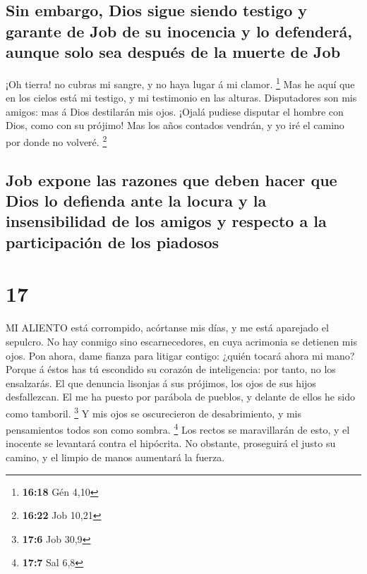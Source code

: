 \hypertarget{sin-embargo-dios-sigue-siendo-testigo-y-garante-de-job-de-su-inocencia-y-lo-defenderuxe1-aunque-solo-sea-despuuxe9s-de-la-muerte-de-job}{%
\subsection{Sin embargo, Dios sigue siendo testigo y garante de Job de
su inocencia y lo defenderá, aunque solo sea después de la muerte de
Job}\label{sin-embargo-dios-sigue-siendo-testigo-y-garante-de-job-de-su-inocencia-y-lo-defenderuxe1-aunque-solo-sea-despuuxe9s-de-la-muerte-de-job}}

 ¡Oh tierra! no cubras mi sangre, y no haya lugar á mi
clamor. \footnote{\textbf{16:18} Gén 4,10}  Mas he aquí que
en los cielos está mi testigo, y mi testimonio en las alturas.
 Disputadores son mis amigos: mas á Dios destilarán mis
ojos.  ¡Ojalá pudiese disputar el hombre con Dios, como con
su prójimo!  Mas los años contados vendrán, y yo iré el
camino por donde no volveré. \footnote{\textbf{16:22} Job 10,21}

\hypertarget{job-expone-las-razones-que-deben-hacer-que-dios-lo-defienda-ante-la-locura-y-la-insensibilidad-de-los-amigos-y-respecto-a-la-participaciuxf3n-de-los-piadosos}{%
\subsection{Job expone las razones que deben hacer que Dios lo defienda
ante la locura y la insensibilidad de los amigos y respecto a la
participación de los
piadosos}\label{job-expone-las-razones-que-deben-hacer-que-dios-lo-defienda-ante-la-locura-y-la-insensibilidad-de-los-amigos-y-respecto-a-la-participaciuxf3n-de-los-piadosos}}

\hypertarget{section-16}{%
\section{17}\label{section-16}}

 MI ALIENTO está corrompido, acórtanse mis días, y me está
aparejado el sepulcro.  No hay conmigo sino escarnecedores,
en cuya acrimonia se detienen mis ojos.  Pon ahora, dame
fianza para litigar contigo: ¿quién tocará ahora mi mano? 
Porque á éstos has tú escondido su corazón de inteligencia: por tanto,
no los ensalzarás.  El que denuncia lisonjas á sus prójimos,
los ojos de sus hijos desfallezcan.  El me ha puesto por
parábola de pueblos, y delante de ellos he sido como tamboril.
\footnote{\textbf{17:6} Job 30,9}  Y mis ojos se
oscurecieron de desabrimiento, y mis pensamientos todos son como sombra.
\footnote{\textbf{17:7} Sal 6,8}  Los rectos se maravillarán
de esto, y el inocente se levantará contra el hipócrita.  No
obstante, proseguirá el justo su camino, y el limpio de manos aumentará
la fuerza.

